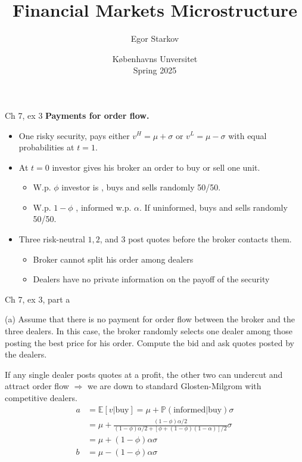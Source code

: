\documentclass[english,10pt
,aspectratio=169
]{beamer}
\title{Financial Markets Microstructure}
\author{Egor Starkov}
\date{K{\o}benhavns Unversitet \\
	Spring 2025}
\begin{document}
	

\begin{frame}{Ch 7, ex 3}
	\textbf{Payments for order flow. }
	\begin{itemize}
		\item One risky security, pays either $v^{H}=\mu +\sigma $ or $v^{L}=\mu -\sigma $ with equal probabilities at $t=1$.
		\item At $t=0$ investor gives his broker an order to buy or sell one unit.
		\begin{itemize}
			\item W.p. $\phi$ investor is , buys and sells randomly 50/50.
			\item W.p. $1-\phi$ , \alert{informed} w.p. $\alpha$. If uninformed, buys and sells randomly 50/50.
		\end{itemize}
		\item Three risk-neutral  $1,2$, and $3$ post quotes before the broker contacts them.
		\begin{itemize}
			\item Broker cannot split his order among dealers
			\item Dealers have no private information on the payoff of the security
		\end{itemize}
	\end{itemize}
\end{frame}


\begin{frame}{Ch 7, ex 3, part a}
	\begin{exampleblock}{}
		(a) Assume that there is no payment for order flow between the
		broker and the three dealers. In this case, the broker randomly selects one
		dealer among those posting the best price for his order. Compute the bid and
		ask quotes posted by the dealers.
	\end{exampleblock}
	
	\pause
	
	If any single dealer posts quotes at a profit, the other two can undercut and attract order flow $\Rightarrow$ we are down to standard Glosten-Milgrom with competitive dealers.
	\begin{align*}
		a &= \mathbb{E}[v|\text{buy}] = \mu + \mathbb{P}(\text{informed}|\text{buy}) \sigma
		\\
		&= \mu + \frac{(1-\phi)\alpha/2}{(1-\phi)\alpha/2 + \left[\phi+(1-\phi)(1-\alpha) \right]/2} \sigma
		\\
		&= \mu + (1-\phi)\alpha \sigma
		\\
		b &= \mu - (1-\phi)\alpha \sigma
	\end{align*}
\end{frame}
\end{document}
